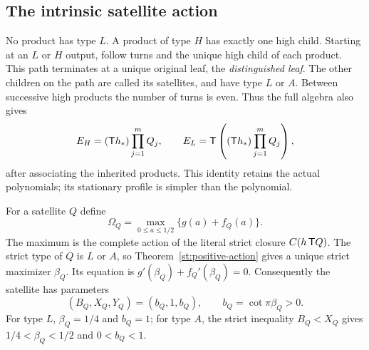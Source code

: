 \subsection{The intrinsic satellite action}
No product has type $L$. A product of type $H$ has
exactly one high child. Starting at an $L$ or $H$
output, follow turns and the unique high child of
each product. This path terminates at a unique
original leaf, the \emph{distinguished leaf}.
The other children on the path are called its
satellites, and have type $L$ or $A$.
Between successive high products the number of turns
is even. Thus the full algebra also gives
\begin{equation}\label{st:spine-source}
 E_H=(\mathsf T h_*)\prod_{j=1}^m Q_j,\qquad
 E_L=\mathsf T\left((\mathsf T h_*)\prod_{j=1}^m Q_j\right),
\end{equation}
after associating the inherited products. This
identity retains the actual polynomials; its
stationary profile is simpler than the polynomial.

For a satellite $Q$ define
\begin{equation}\label{st:Omega}
 \Omega_Q=\max_{0\le a\le1/2}\{g(a)+f_Q(a)\}.
\end{equation}
The maximum is the complete action of the literal
strict closure $C(h\,\mathsf T Q)$. The strict type of
$Q$ is $L$ or $A$, so Theorem~\ref{st:positive-action}
gives a unique strict maximizer $\beta_Q$.
Its equation is
$g'(\beta_Q)+f_Q'(\beta_Q)=0$.
Consequently the satellite has parameters
\begin{equation}\label{st:satellite-parameters}
 (B_Q,X_Q,Y_Q)=(b_Q,1,b_Q),\qquad
 b_Q=\cot\pi\beta_Q>0 .
\end{equation}
For type $L$, $\beta_Q=1/4$ and $b_Q=1$;
for type $A$, the strict inequality $B_Q<X_Q$
gives $1/4<\beta_Q<1/2$ and $0<b_Q<1$.

